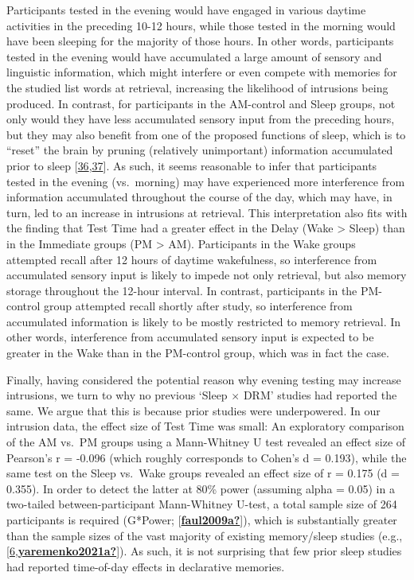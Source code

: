 \documentclass[
]{article}
\begin{document}
Participants tested in the evening would have engaged in various daytime activities in the preceding 10-12 hours, while those tested in the morning would have been sleeping for the majority of those hours. In other words, participants tested in the evening would have accumulated a large amount of sensory and linguistic information, which might interfere or even compete with memories for the studied list words at retrieval, increasing the likelihood of intrusions being produced. In contrast, for participants in the AM-control and Sleep groups, not only would they have less accumulated sensory input from the preceding hours, but they may also benefit from one of the proposed functions of sleep, which is to ``reset'' the brain by pruning (relatively unimportant) information accumulated prior to sleep {[}\protect\hyperlink{ref-tononi2006a}{36},\protect\hyperlink{ref-tononi2014a}{37}{]}. As such, it seems reasonable to infer that participants tested in the evening (vs.~morning) may have experienced more interference from information accumulated throughout the course of the day, which may have, in turn, led to an increase in intrusions at retrieval. This interpretation also fits with the finding that Test Time had a greater effect in the Delay (Wake \textgreater{} Sleep) than in the Immediate groups (PM \textgreater{} AM). Participants in the Wake groups attempted recall after 12 hours of daytime wakefulness, so interference from accumulated sensory input is likely to impede not only retrieval, but also memory storage throughout the 12-hour interval. In contrast, participants in the PM-control group attempted recall shortly after study, so interference from accumulated information is likely to be mostly restricted to memory retrieval. In other words, interference from accumulated sensory input is expected to be greater in the Wake than in the PM-control group, which was in fact the case.

Finally, having considered the potential reason why evening testing may increase intrusions, we turn to why no previous `Sleep \(\times\) DRM' studies had reported the same. We argue that this is because prior studies were underpowered. In our intrusion data, the effect size of Test Time was small: An exploratory comparison of the AM vs.~PM groups using a Mann-Whitney U test revealed an effect size of Pearson's r = -0.096 (which roughly corresponds to Cohen's d = 0.193), while the same test on the Sleep vs.~Wake groups revealed an effect size of r = 0.175 (d = 0.355). In order to detect the latter at 80\% power (assuming alpha = 0.05) in a two-tailed between-participant Mann-Whitney U-test, a total sample size of 264 participants is required (G*Power; {[}\protect\hyperlink{ref-faul2009a}{\textbf{faul2009a?}}{]}), which is substantially greater than the sample sizes of the vast majority of existing memory/sleep studies (e.g., {[}\protect\hyperlink{ref-payne2009a}{6},\protect\hyperlink{ref-yaremenko2021a}{\textbf{yaremenko2021a?}}{]}). As such, it is not surprising that few prior sleep studies had reported time-of-day effects in declarative memories.
\end{document}
